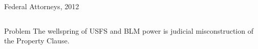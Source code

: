 \begin{frame}{Federal Attorneys, 2012}
\begin{table}[h]
\begin{tabular}{p{} p{}}
\end{tabular}
\end{table}
\end{frame}

%
%

\begin{frame}
    \begin{varblock}[.8\textwidth]{Problem}
        The wellspring of USFS and BLM power is judicial misconstruction of the Property Clause.
    \end{varblock}
\end{frame}

